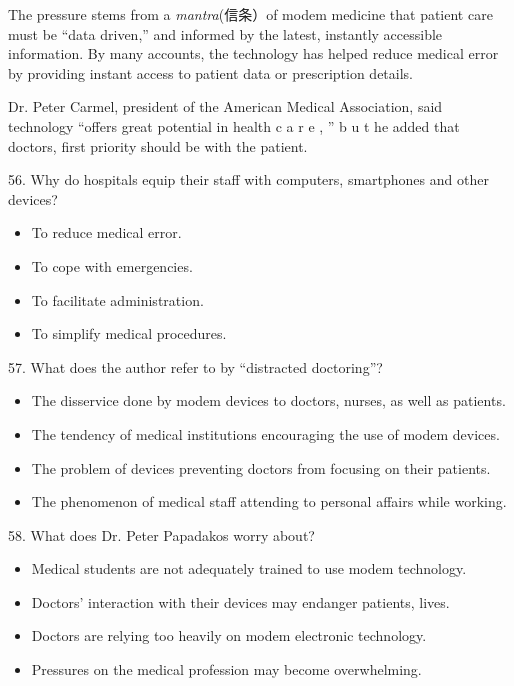 \documentclass[UTF8,11pt]{ctexart}
\begin{document}
The pressure stems from a\textit{ mantra}(信条）of modem medicine that patient care must be “data driven,” and informed by the latest, instantly accessible information. By many accounts, the technology has helped reduce medical error by providing instant access to patient data or prescription details.


Dr. Peter Carmel, president of the American Medical Association, said technology “offers great potential in health c a r e , ” b u t he added that doctors, first priority should be with the patient.


56. Why do hospitals equip their staff with computers, smartphones and other devices?


\begin{itemize}[leftmargin=2em,itemsep=.2em,topsep=.4em]\item[A.] To reduce medical error.
\item[B.] To cope with emergencies.
\item[C.] To facilitate administration.
\item[D.] To simplify medical procedures.
\end{itemize}

57. What does the author refer to by “distracted doctoring”?


\begin{itemize}[leftmargin=2em,itemsep=.2em,topsep=.4em]\item[A.] The disservice done by modem devices to doctors, nurses, as well as patients.
\item[B.] The tendency of medical institutions encouraging the use of modem devices.
\item[C.] The problem of devices preventing doctors from focusing on their patients.
\item[D.] The phenomenon of medical staff attending to personal affairs while working.
\end{itemize}

58. What does Dr. Peter Papadakos worry about?


\begin{itemize}[leftmargin=2em,itemsep=.2em,topsep=.4em]\item[A.] Medical students are not adequately trained to use modem technology.
\item[B.] Doctors’ interaction with their devices may endanger patients, lives.
\item[C.] Doctors are relying too heavily on modem electronic technology.
\item[D.] Pressures on the medical profession may become overwhelming.
\end{itemize}
\end{document}

